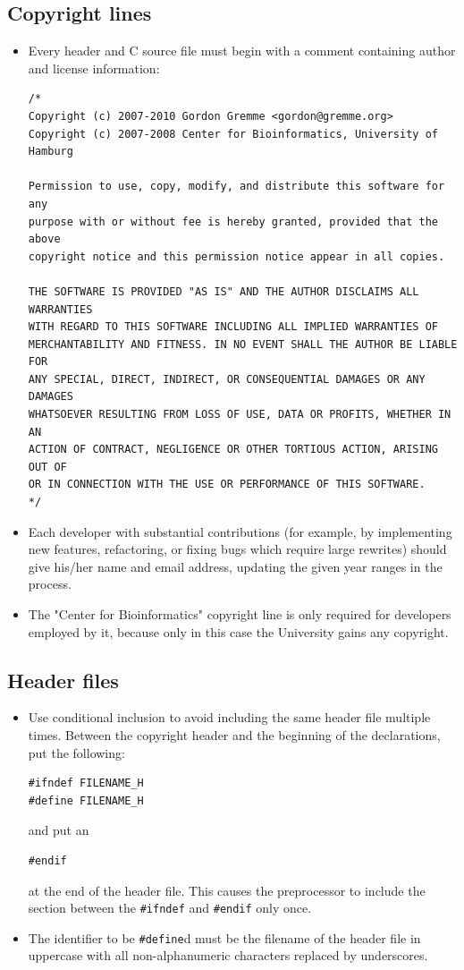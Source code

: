 \documentclass[11pt,final]{article}
\newcommand{\keyword}[1]{\lstinline{#1}}
\begin{document}
\subsection{Copyright lines}
\label{copyright}
\begin{itemize}
\item
Every header and C source file must begin with a comment containing author and
license information:
\begin{lstlisting}
/*
Copyright (c) 2007-2010 Gordon Gremme <gordon@gremme.org>
Copyright (c) 2007-2008 Center for Bioinformatics, University of Hamburg

Permission to use, copy, modify, and distribute this software for any
purpose with or without fee is hereby granted, provided that the above
copyright notice and this permission notice appear in all copies.

THE SOFTWARE IS PROVIDED "AS IS" AND THE AUTHOR DISCLAIMS ALL WARRANTIES
WITH REGARD TO THIS SOFTWARE INCLUDING ALL IMPLIED WARRANTIES OF
MERCHANTABILITY AND FITNESS. IN NO EVENT SHALL THE AUTHOR BE LIABLE FOR
ANY SPECIAL, DIRECT, INDIRECT, OR CONSEQUENTIAL DAMAGES OR ANY DAMAGES
WHATSOEVER RESULTING FROM LOSS OF USE, DATA OR PROFITS, WHETHER IN AN
ACTION OF CONTRACT, NEGLIGENCE OR OTHER TORTIOUS ACTION, ARISING OUT OF
OR IN CONNECTION WITH THE USE OR PERFORMANCE OF THIS SOFTWARE.
*/
\end{lstlisting}
\item
Each developer with substantial contributions (for example, by implementing new
features, refactoring, or fixing bugs which require large rewrites) should
give his/her name and email address, updating the given year ranges in the
process.
\item The "Center for Bioinformatics" copyright line is only required for
developers employed by it, because only in this case the University gains any
copyright.
\end{itemize}

\subsection{Header files}
\begin{itemize}
\item
Use conditional inclusion to avoid including the same header file multiple
times. Between the copyright header and the beginning of the declarations, put
the following:
\begin{lstlisting}
#ifndef FILENAME_H
#define FILENAME_H
\end{lstlisting}
and put an
\begin{lstlisting}
#endif
\end{lstlisting}
at the end of the header file.
This causes the preprocessor to include the section between the
\keyword{#ifndef} and \keyword{#endif} only once.
\item
The identifier to be \keyword{#define}d must be the filename of the header
file in uppercase with all non-alphanumeric characters replaced by underscores.
\end{itemize}
\end{document}
